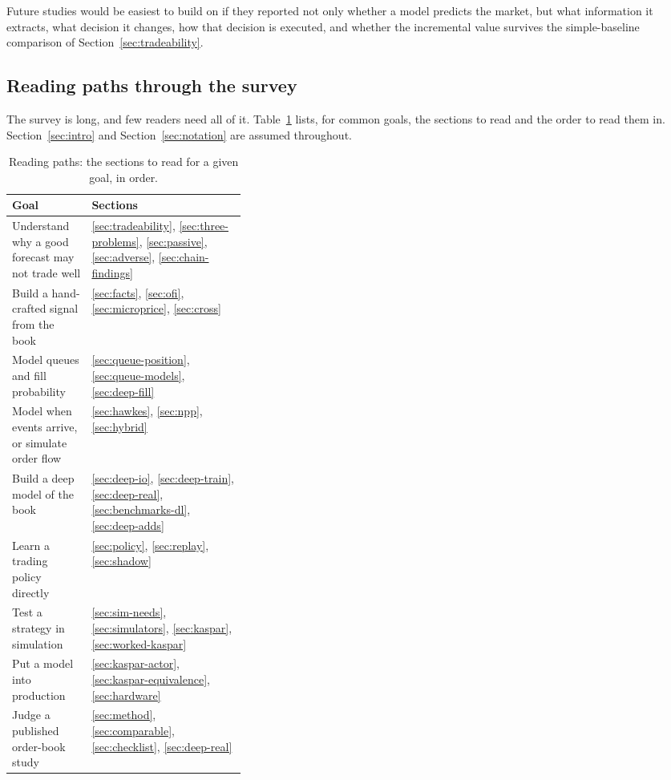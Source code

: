 Future studies would be easiest to build on if they reported not only whether a model predicts the market,
but what information it extracts, what decision it changes, how that decision is executed, and
whether the incremental value survives the simple-baseline comparison of Section~\ref{sec:tradeability}.

\subsection{Reading paths through the survey}
\label{sec:reading-paths}

The survey is long, and few readers need all of it. Table~\ref{tab:reading-paths} lists, for common goals, the
sections to read and the order to read them in. Section~\ref{sec:intro} and Section~\ref{sec:notation} are assumed
throughout.

\begin{table}[!htbp]
\centering\small
\caption{Reading paths: the sections to read for a given goal, in order.}
\label{tab:reading-paths}
\begin{tabularx}{\linewidth}{>{\raggedright\arraybackslash}p{0.34\linewidth}X}
\toprule
Goal & Sections \\
\midrule
Understand why a good forecast may not trade well & \ref{sec:tradeability}, \ref{sec:three-problems},
  \ref{sec:passive}, \ref{sec:adverse}, \ref{sec:chain-findings} \\
Build a hand-crafted signal from the book & \ref{sec:facts}, \ref{sec:ofi}, \ref{sec:microprice}, \ref{sec:cross} \\
Model queues and fill probability & \ref{sec:queue-position}, \ref{sec:queue-models}, \ref{sec:deep-fill} \\
Model when events arrive, or simulate order flow & \ref{sec:hawkes}, \ref{sec:npp}, \ref{sec:hybrid} \\
Build a deep model of the book & \ref{sec:deep-io}, \ref{sec:deep-train}, \ref{sec:deep-real}, \ref{sec:benchmarks-dl},
  \ref{sec:deep-adds} \\
Learn a trading policy directly & \ref{sec:policy}, \ref{sec:replay}, \ref{sec:shadow} \\
Test a strategy in simulation & \ref{sec:sim-needs}, \ref{sec:simulators}, \ref{sec:kaspar}, \ref{sec:worked-kaspar} \\
Put a model into production & \ref{sec:kaspar-actor}, \ref{sec:kaspar-equivalence}, \ref{sec:hardware} \\
Judge a published order-book study & \ref{sec:method}, \ref{sec:comparable}, \ref{sec:checklist}, \ref{sec:deep-real} \\
\bottomrule
\end{tabularx}
\end{table}

